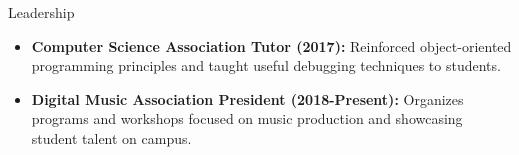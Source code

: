 \documentclass[]{johnsoncv}
\begin{document}

	
	\begin{cvsection}{Leadership}
		\begin{cvsubsection}{}{}{}	
			\begin{itemize}
				\item \textbf{Computer Science Association Tutor (2017):} Reinforced object-oriented programming principles and taught useful debugging techniques to students.
				\item \textbf{Digital Music Association President (2018-Present):} Organizes programs and workshops focused on music production and showcasing student talent on campus.
			\end{itemize}
		\end{cvsubsection}
	\end{cvsection}
\end{document}
